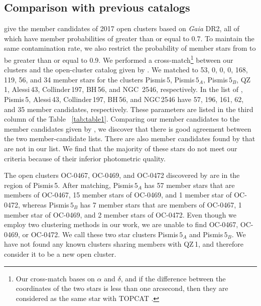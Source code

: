 \documentclass{aa} %
\begin{document}
\subsection{Comparison with previous catalogs} \label{subsec:compare}

\citet{2020A&A...633A..99C} give the member candidates of 2017 open clusters based on {\it Gaia} DR2, all 
of which have member probabilities of greater than or equal to 0.7. 
To maintain the same contamination rate, we also restrict the probability of member stars from 
\citet{2020A&A...633A..99C} to be greater than or equal to 0.9.
We performed a cross-match\footnote{Our cross-match bases on $\alpha$ and $\delta$, and if the difference between the coordinates of the two stars is less than one arcsecond, 
then they are considered as the same star with TOPCAT \citep{tayl05}.} between our clusters and the 
open-cluster catalog given by \citet{2020A&A...633A..99C}. We matched to 53, 0, 0, 0, 168, 
119, 56, and 34 member stars for the clusters Pismis\,5, Pismis$\,5_{A}$, Pismis$\,5_{B}$, QZ\,1, 
Alessi\,43, Collinder\,197, BH\,56, and NGC\, 2546, respectively. In the list of \cite{2020A&A...633A..99C}, 
Pismis\,5, Alessi\,43, Collinder\,197, BH\,56, and NGC\,2546 have 57, 196, 161, 62, and 35 member candidates, 
respectively. These parameters are listed in the third column of the Table ~\ref{tab:table1}.
Comparing our member candidates to the  member candidates given by \cite{2020A&A...633A..99C}, we discover that there is good agreement between the two member-candidate lists. There are also member candidates found by \cite{2020A&A...633A..99C} that are not in our list. We find that the majority of these stars do not meet our criteria because of their inferior photometric quality.

The open clusters 
OC-0467, OC-0469, and OC-0472 discovered by \citet{2022A&A...660A...4H} are in the region of 
Pismis\,5. After matching, Pismis$\,5_{A}$ has 57 member stars that are members of 
OC-0467, 15 member stars of OC-0469, and 1 member star of OC-0472, whereas Pismis$\,5_{B}$ has 7 
member stars that are members of OC-0467, 1 member star of OC-0469, and 2 member stars of OC-0472. 
Even though we employ two clustering methods in our work, we are unable to find OC-0467, 
OC-0469, or OC-0472. We call these two star clusters Pismis$\,5_{A}$ and Pismis$\,5_{B}$. 
We have not found any known clusters sharing members with QZ\,1, and therefore consider it to be a new open cluster.
\end{document}
